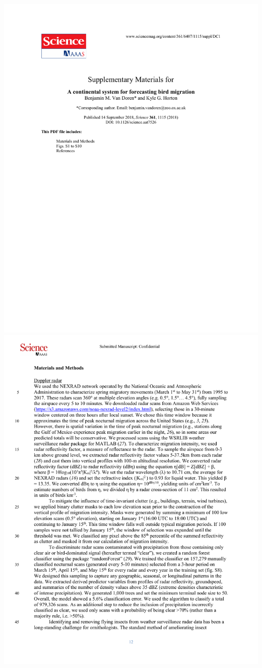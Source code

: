 \documentclass[a4paper, twoside]{templates/ociamthesis}
\begin{document}
\includegraphics[width=1\linewidth]{pdf_chapters/forecast/forecast_supp_crop_Part01}
\includegraphics[width=1\linewidth]{pdf_chapters/forecast/forecast_supp_crop_Part02}
\end{document}
